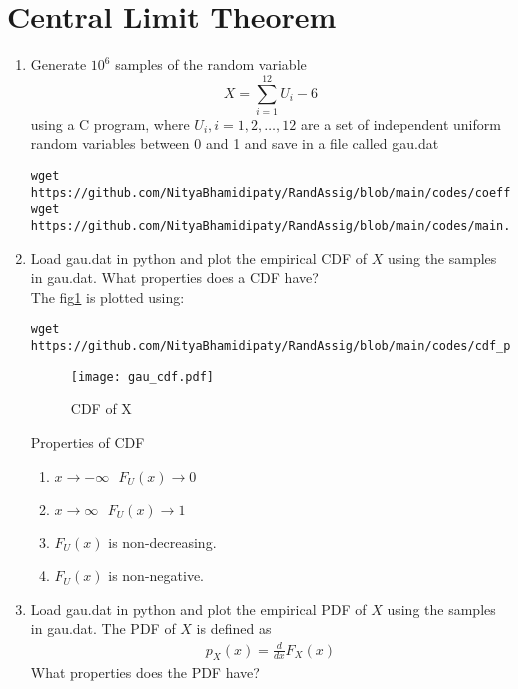 \documentclass[journal,12pt,twocolumn]{IEEEtran}
\renewcommand\thesection{\arabic{section}}
\begin{document}
\section{Central Limit Theorem}
%
\begin{enumerate}[label=\thesection.\arabic*
,ref=\thesection.\theenumi]

%
\item
Generate $10^6$ samples of the random variable
%
\begin{equation}
X = \sum_{i=1}^{12}U_i -6
\end{equation}
%
using a C program, where $U_i, i = 1,2,\dots, 12$ are  a set of independent uniform random variables between 0 and 1
and save in a file called gau.dat
\\
\solution
\begin{lstlisting}
wget https://github.com/NityaBhamidipaty/RandAssig/blob/main/codes/coeffs.h
wget https://github.com/NityaBhamidipaty/RandAssig/blob/main/codes/main.c
\end{lstlisting}
\item
Load gau.dat in python and plot the empirical CDF of $X$ using the samples in gau.dat. What properties does a CDF have?
\\
\solution
The fig\ref{fig:gau_cdf} is plotted using:
\begin{lstlisting}
wget https://github.com/NityaBhamidipaty/RandAssig/blob/main/codes/cdf_plot.py
\end{lstlisting}
\begin{figure}[h]
    \centering
    \texttt{[image: gau\_cdf.pdf]}
    \caption{CDF of X}
    \label{fig:gau_cdf}
\end{figure}
Properties of CDF
\begin{enumerate}
    \item $x\rightarrow{-\infty}\text{        } F_U(x) \rightarrow{0}$
    \item $x\rightarrow{\infty}\text{        } F_U(x) \rightarrow{1}$
    \item $F_U(x)$ is non-decreasing.
    \item $F_U(x)$ is non-negative.
\end{enumerate}
\item
Load gau.dat in python and plot the empirical PDF of $X$ using the samples in gau.dat. The PDF of $X$ is defined as
\begin{align}
p_{X}(x) = \frac{d}{dx}F_{X}(x)
\end{align}
What properties does the PDF have?
\\

\end{enumerate}
\end{document}

